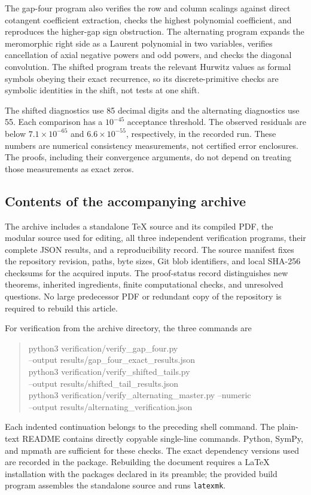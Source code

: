 The gap-four program also verifies the row and column scalings
against direct cotangent coefficient extraction, checks the highest
polynomial coefficient, and reproduces the higher-gap sign obstruction.
The alternating program expands the meromorphic right side as a
Laurent polynomial in two variables, verifies cancellation of axial
negative powers and odd powers, and checks the diagonal convolution.
The shifted program treats the relevant Hurwitz values as formal
symbols obeying their exact recurrence, so its discrete-primitive
checks are symbolic identities in the shift, not tests at one shift.

The shifted diagnostics use 85 decimal digits and the alternating
diagnostics use 55. Each comparison has a $10^{-45}$ acceptance
threshold. The observed residuals are below $7.1\times10^{-65}$ and
$6.6\times10^{-55}$, respectively, in the recorded run. These numbers
are numerical consistency measurements, not certified error
enclosures. The proofs, including their convergence arguments, do not
depend on treating those measurements as exact zeros.

\subsection{Contents of the accompanying archive}

The archive includes a standalone TeX source and its compiled PDF,
the modular source used for editing, all three independent verification
programs, their complete JSON results, and a reproducibility record.
The source manifest fixes the repository revision, paths, byte sizes,
Git blob identifiers, and local SHA-256 checksums for the acquired
inputs. The proof-status record distinguishes new theorems,
inherited ingredients, finite computational checks, and unresolved
questions. No large predecessor PDF or redundant copy of the
repository is required to rebuild this article.

For verification from the archive directory, the three commands are
\begin{quote}\small\ttfamily
python3 verification/verify\_gap\_four.py\\
\hspace*{1em}--output results/gap\_four\_exact\_results.json\\[4pt]
python3 verification/verify\_shifted\_tails.py\\
\hspace*{1em}--output results/shifted\_tail\_results.json\\[4pt]
python3 verification/verify\_alternating\_master.py --numeric\\
\hspace*{1em}--output results/alternating\_verification.json
\end{quote}
Each indented continuation belongs to the preceding shell command.
The plain-text README contains directly copyable single-line commands.
Python, SymPy, and mpmath are sufficient for these checks. The exact
dependency versions used are recorded in the package. Rebuilding the
document requires a LaTeX installation with the packages declared in
its preamble; the provided build program assembles the standalone
source and runs \texttt{latexmk}.


